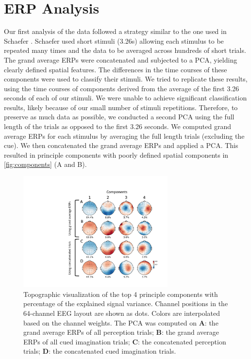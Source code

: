 \chapter{ERP Analysis}
Our first analysis of the data followed a strategy similar to the one used in Schaefer \etal \citeyear{schaefer_name_2011}.
Schaefer \etal \citeyear{schaefer_name_2011} used short stimuli (3.26s) allowing each stimulus to be repeated many times and the data to be averaged across hundreds of short trials. 
The grand average \acp{ERP} were concatenated and subjected to a \ac{PCA}, yielding clearly defined spatial features. 
The differences in the time courses of these components were used to classify their stimuli. 
We tried to replicate these results, using the time courses of components derived from the average of the first 3.26 seconds of each of our stimuli. 
We were unable to achieve significant classification results, likely because of our small number of stimuli repetitions.
Therefore, to preserve as much data as possible, we conducted a second \ac{PCA} using the full length of the trials as opposed to the first 3.26 seconds. 
We computed grand average \acp{ERP} for each stimulus by averaging the full length trials (excluding the cue).
We then concatenated the grand average \acp{ERP} and applied a \ac{PCA}. 
This resulted in principle components with poorly defined spatial components in \autoref{fig:components} (A and B).
\begin{figure}[htb]	%
  \centerline{\includegraphics[width=0.7\textwidth]{Figures/principal_components_labels.pdf}}
  \caption{Topographic visualization of the top 4 principle components with percentage of the explained signal variance. Channel positions in the 64-channel EEG layout are shown as dots. Colors are interpolated based on the channel weights. The PCA was computed on {\bf A}: the grand average \acp{ERP} of all perception trials; {\bf B}: the grand average \acp{ERP} of all cued imagination trials; {\bf C}: the concatenated perception trials; {\bf D}: the concatenated cued imagination trials.}
  \label{fig:components}
\end{figure}

